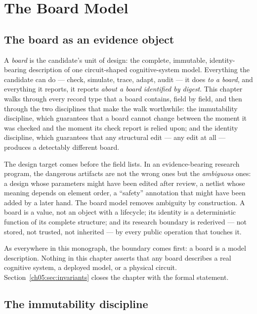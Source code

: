 \chapter{The Board Model}\label{ch05:chapter}

\section{The board as an evidence object}\label{ch05:sec:intro}

A \emph{board} is the candidate's unit of design: the complete, immutable,
identity-bearing description of one circuit-shaped cognitive-system model.
Everything the candidate can do --- check, simulate, trace, adapt, audit
--- it does \emph{to a board}, and everything it reports, it reports
\emph{about a board identified by digest}. This chapter walks through
every record type that a board contains, field by field, and then through
the two disciplines that make the walk worthwhile: the immutability
discipline, which guarantees that a board cannot change between the moment
it was checked and the moment its check report is relied upon; and the
identity discipline, which guarantees that any structural edit --- any
edit at all --- produces a detectably different board.

The design target comes before the field lists. In an
evidence-bearing research program, the dangerous artifacts are not the
wrong ones but the \emph{ambiguous} ones: a design whose parameters might
have been edited after review, a netlist whose meaning depends on element
order, a ``safety'' annotation that might have been added by a later hand.
The board model removes ambiguity by construction. A board is a value, not
an object with a lifecycle; its identity is a deterministic function of
its complete structure; and its research boundary is rederived --- not
stored, not trusted, not inherited --- by every public operation that
touches it.

As everywhere in this monograph, the boundary comes first: a board is a
model description. Nothing in this chapter asserts that any board
describes a real cognitive system, a deployed model, or a physical
circuit. Section~\ref{ch05:sec:invariants} closes the chapter with the
formal statement.

\section{The immutability discipline}\label{ch05:sec:immutability}

